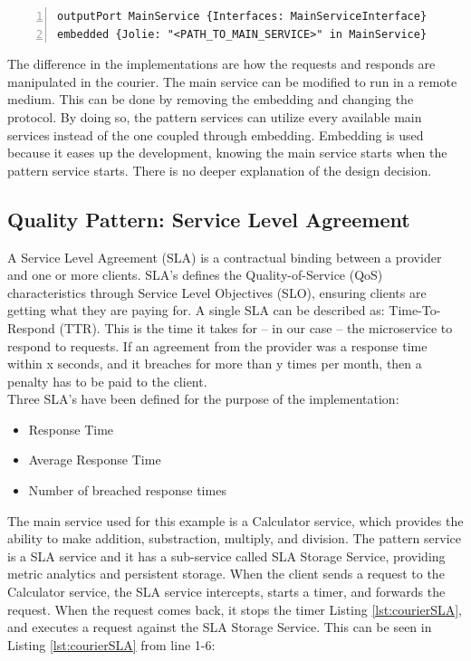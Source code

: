 \documentclass[12pt]{article}
\begin{document}
\begin{lstlisting}[caption=Embed main service into the pattern service, 
    captionpos=b, label={lst:embedService}, frame=single, breaklines=true, numbers=left, basicstyle=\scriptsize]
outputPort MainService {Interfaces: MainServiceInterface}
embedded {Jolie: "<PATH_TO_MAIN_SERVICE>" in MainService}
\end{lstlisting}

The difference in the implementations are how the requests and responds are manipulated in the courier. The main service can be modified to run in a remote medium. This can be done by removing the embedding and changing the protocol. By doing so, the pattern services can utilize every available main services instead of the one coupled through embedding. Embedding is used because it eases up the development, knowing the main service starts when the pattern service starts. There is no deeper explanation of the design decision.

\subsection{Quality Pattern: Service Level Agreement}
A Service Level Agreement (SLA) \cite{SLA} is a contractual binding between a provider and one or more clients. SLA's defines the Quality-of-Service (QoS) \cite{QoS} characteristics through Service Level Objectives (SLO), ensuring clients are getting what they are paying for. A single SLA can be described as: Time-To-Respond (TTR). This is the time it takes for -- in our case -- the microservice to respond to requests. If an agreement from the provider was a response time within x seconds, and it breaches for more than y times per month, then a penalty has to be paid to the client. \\

Three SLA's have been defined for the purpose of the implementation:
\begin{itemize}
    \item Response Time
    \item Average Response Time
    \item Number of breached response times
\end{itemize}

The main service used for this example is a Calculator service, which provides the ability to make addition, substraction, multiply, and division. The pattern service is a SLA service and it has a sub-service called SLA Storage Service, providing metric analytics and persistent storage. When the client sends a request to the Calculator service, the SLA service intercepts, starts a timer, and forwards the request. When the request comes back, it stops the timer Listing \ref{lst:courierSLA}, and executes a request against the SLA Storage Service. This can be seen in Listing \ref{lst:courierSLA} from line 1-6:
\end{document}
